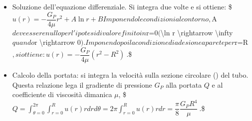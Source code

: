 \documentclass[letterpaper,10pt,italian]{jupyterBook}
\begin{document}
\begin{itemize}
\begin{itemize}
\item {} 
\sphinxAtStartPar
problema assialsimmetrico:
\(\dfrac{\partial}{\partial \theta} = 0\);

\item {} 
\sphinxAtStartPar
no swirl: \(u_{\theta} = 0\);

\item {} 
\sphinxAtStartPar
dall’incomprimibilità e dalle condizioni al contorno a parete,
segue che la componente radiale della velocità è identicamente
nulla, \(u_r = 0\);

\item {} 
\sphinxAtStartPar
no forze di volume: \(\bm{f} = 0\).

\end{itemize}

\sphinxAtStartPar
Grazie alle ipotesi fatte, il campo di velocità assume la forma
\(\bm{u}(\bm{r}) = u(r) \bm{\hat{z}}\). La componente radiale e
azimuthale dell’equazione della quantità di moto sono identicamente
soddisfatte, mentre la componente lungo \(z\) diventa \$\(\begin{cases}
     \mu \dfrac{1}{r} \dfrac{d}{dr}\left( r \dfrac{d}{dr} u(r)\right) = -G_P & r \in[0,R] \\
    u(0) = \)valore finito\(  \\ u(R) = 0
  \end{cases}\)\( dove la derivata ordinaria \)\textbackslash{}dfrac\{d\}\{d r\}\( è stata
utilizzata al posto della derivta parziale, poichè la componente
assiale della velocità dipende solamente dalla coordinata radiale,
\)u(r)\$. Le condizioni al contorno garantiscono che il campo di
velocità sia regolare nel dominio (in particolare che non esistano
singolarità sull’asse) e che sia soddisfatta la condizione al
contorno di adesione a parete.

\item {} 
\sphinxAtStartPar
Soluzione dell’equazione differenziale. Si integra due volte e si
ottiene: \$\(u(r) = -\dfrac{G_P}{4 \mu} r^2 + A \ln{r} + B\)\( Imponendo
le condizioni al contorno, \)A\( deve essere nullo per l'ipotesi di
valore finito in \)r=0\( (\)\textbackslash{}ln r \textbackslash{}rightarrow \sphinxhyphen{}\textbackslash{}infty\( quando
\)r \textbackslash{}rightarrow 0\(). Imponendo poi la condizione di adesione a parete
per \)r=R\(, si ottiene:
\)\(u(r) = -\dfrac{G_P}{4 \mu} (r^2 - R^2) \ .\)\$

\item {} 
\sphinxAtStartPar
Calcolo della portata: si integra la velocità sulla sezione
circolare (\sphinxstylestrong{!}) del tubo. Questa relazione lega il gradiente di
pressione \(G_P\) alla portata \(Q\) e al coefficiente di viscosità
dimanica \(\mu\),
\$\(Q = \int_{\theta=0}^{2\pi} \int_{r=0}^{R} u(r) r dr d\theta = 
  2\pi \int_{r=0}^{R} u(r) r dr =
  \dfrac{\pi}{8}\dfrac{G_P R^4}{\mu} \ .\)\$


\end{itemize}
\end{document}
